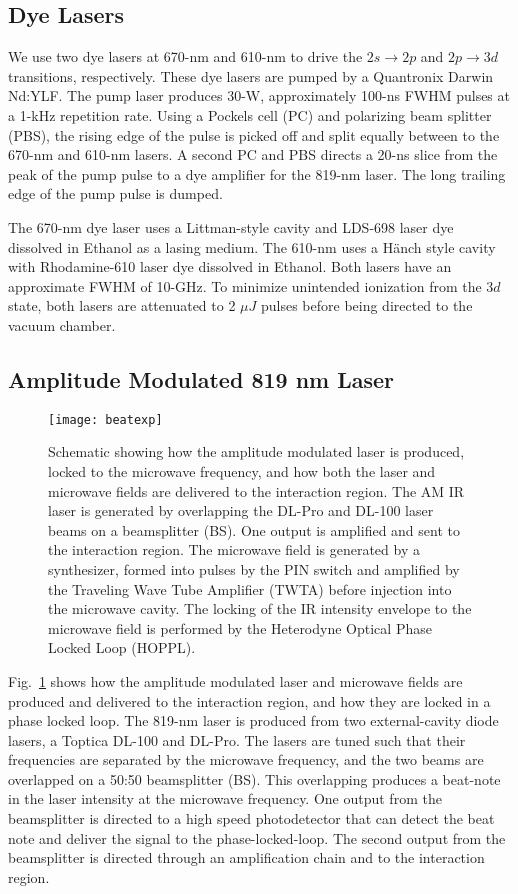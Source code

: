 \documentclass[aps,pra,preprint,groupedaddress]{revtex4-1}
\begin{document}
\subsection{\label{sec:dye} Dye Lasers}

We use two dye lasers at 670-nm and 610-nm to drive the $2s \rightarrow 2p$ and $2p \rightarrow 3d$ transitions, respectively. These dye lasers are pumped by a Quantronix Darwin Nd:YLF. The pump laser produces 30-W, approximately 100-ns FWHM pulses at a 1-kHz repetition rate. Using a Pockels cell (PC) and polarizing beam splitter (PBS), the rising edge of the pulse is picked off and split equally between to the 670-nm and 610-nm lasers. A second PC and PBS directs a 20-ns slice from the peak of the pump pulse to a dye amplifier for the 819-nm laser. The long trailing edge of the pump pulse is dumped.

The 670-nm dye laser uses a Littman-style cavity and LDS-698 laser dye dissolved in Ethanol as a lasing medium. The 610-nm uses a H{\"a}nch style cavity with Rhodamine-610 laser dye dissolved in Ethanol. Both lasers have an approximate FWHM of 10-GHz. To minimize unintended ionization from the $3d$ state, both lasers are attenuated to 2 $\mu J$ pulses before being directed to the vacuum chamber.

\subsection{\label{sec:ampmod} Amplitude Modulated 819 nm Laser}

\begin{figure}
	\texttt{[image: beatexp]}
	\caption{Schematic showing how the amplitude modulated laser is produced, locked to the microwave frequency, and how both the laser and microwave fields are delivered to the interaction region. The AM IR laser is generated by overlapping the DL-Pro and DL-100 laser beams on a beamsplitter (BS). One output is amplified and sent to the interaction region. The microwave field is generated by a synthesizer, formed into pulses by the PIN switch and amplified by the Traveling Wave Tube Amplifier (TWTA) before injection into the microwave cavity. The locking of the IR intensity envelope to the microwave field is performed by the Heterodyne Optical Phase Locked Loop (HOPPL).}
	\label{fig:pll}
\end{figure}

Fig.~\ref{fig:pll} shows how the amplitude modulated laser and microwave fields are produced and delivered to the interaction region, and how they are locked in a phase locked loop. The 819-nm laser is produced from two external-cavity diode lasers, a Toptica DL-100 and DL-Pro. The lasers are tuned such that their frequencies are separated by the microwave frequency, and the two beams are overlapped on a 50:50 beamsplitter (BS). This overlapping produces a beat-note in the laser intensity at the microwave frequency. One output from the beamsplitter is directed to a high speed photodetector that can detect the beat note and deliver the signal to the phase-locked-loop. The second output from the beamsplitter is directed through an amplification chain and to the interaction region.
\end{document}
